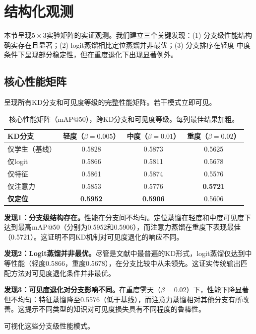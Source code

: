 \section{结构化观测}
\label{sec:observation}

本节呈现$5 \times 3$实验矩阵的实证观测。我们建立三个关键发现：(1) 分支级性能结构确实存在且显著；(2) logit蒸馏相比定位蒸馏并非最优；(3) 分支排序在轻度-中度条件下呈现部分稳定性，但在重度退化下出现显著例外。

\subsection{核心性能矩阵}

呈现所有KD分支和可见度等级的完整性能矩阵。若干模式立即可见。

\begin{table}[htbp]
\centering
\caption{核心性能矩阵（mAP@50），跨KD分支和可见度等级。每列最佳结果加粗。}
\label{tab:core_matrix}
\begin{tabular}{@{}lccc@{}}
\toprule
KD分支 & 轻度（$\beta=0.005$） & 中度（$\beta=0.01$） & 重度（$\beta=0.02$） \\
\midrule
仅学生（基线） & 0.5828 & 0.5873 & 0.5625 \\
仅logit & 0.5866 & 0.5811 & 0.5678 \\
仅特征 & 0.5861 & 0.5874 & 0.5576 \\
仅注意力 & 0.5853 & 0.5776 & \textbf{0.5721} \\
\textbf{仅定位} & \textbf{0.5952} & \textbf{0.5906} & 0.5606 \\
\bottomrule
\end{tabular}
\end{table}

\textbf{发现1：分支级结构存在。}性能在分支间不均匀。定位蒸馏在轻度和中度可见度下达到最高mAP@50（分别为0.5952和0.5906），而注意力蒸馏在重度下表现最佳（0.5721）。这证明不同KD机制对可见度退化的响应不同。

\textbf{发现2：Logit蒸馏并非最优。}尽管是文献中最普遍的KD形式，logit蒸馏仅达到中等性能（轻度0.5866，重度0.5678），在分支比较中从未领先。这证实传统输出匹配方法对可见度退化条件并非最优。

\textbf{发现3：可见度退化对分支影响不同。}在重度雾天（$\beta=0.02$）下，性能下降显著但不均匀：特征蒸馏降至0.5576（低于基线），而注意力蒸馏相对其他分支有所改善。这提示不同类型的知识对可见度损失具有不同程度的鲁棒性。

可视化这些分支级性能模式。

